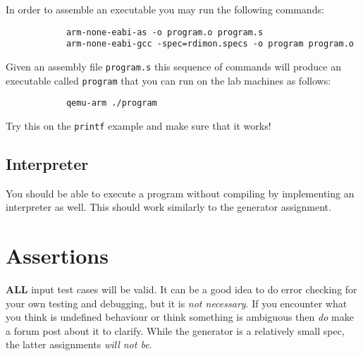 \documentclass{article}
\begin{document}
		In order to assemble an executable you may run the following commands:

		\begin{lstlisting}
			arm-none-eabi-as -o program.o program.s
			arm-none-eabi-gcc -spec=rdimon.specs -o program program.o
		\end{lstlisting}

		Given an assembly file \texttt{program.s} this sequence of commands will produce an executable called
		\texttt{program} that you can run on the lab machines as follows:

		\begin{lstlisting}
			qemu-arm ./program
		\end{lstlisting}

		Try this on the \texttt{printf} example and make sure that it works!


	\subsection{Interpreter}

		You should be able to execute a program without compiling by implementing an interpreter as well. This should
		work similarly to the generator assignment.

\section{Assertions}
\textbf{ALL} input test cases will be valid. It can be a good idea to do error checking for your
own testing and debugging, but it is \textit{not necessary}. If you encounter what you think is
undefined behaviour or think something is ambiguous then \textit{do} make a forum post about it to
clarify. While the generator is a relatively small spec, the latter assignments \textit{will not
be}.
\end{document}
